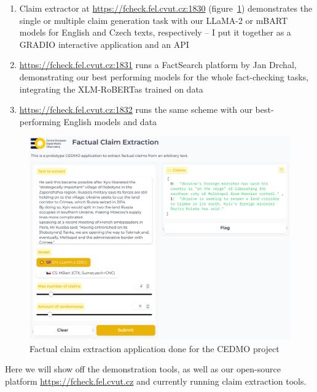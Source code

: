\begin{enumerate}
    \item Claim extractor at \url{https://fcheck.fel.cvut.cz:1830} (figure~\ref{fig:claimgencedmo}) demonstrates the single or multiple claim generation task with our LLaMA-2 or mBART models for English and Czech texts, respectively -- I put it together as a GRADIO interactive application and an API
    \item  \url{https://fcheck.fel.cvut.cz:1831} runs a FactSearch platform by Jan Drchal, demonstrating our best performing models for the whole fact-checking tasks, integrating the XLM-RoBERTas trained on \FCZNLI data
    \item  \url{https://fcheck.fel.cvut.cz:1832} runs the same scheme with our best-performing English models and data
\end{enumerate}

\begin{figure}
    \includegraphics[width=16cm]{fig/cedmo.pdf}
    \caption{Factual claim extraction application done for the CEDMO project}
    \label{fig:claimgencedmo}
\end{figure}

Here we will show off the demonstration tools, as well as our open-source platform \url{https://fcheck.fel.cvut.cz} and currently running claim extraction tools. 